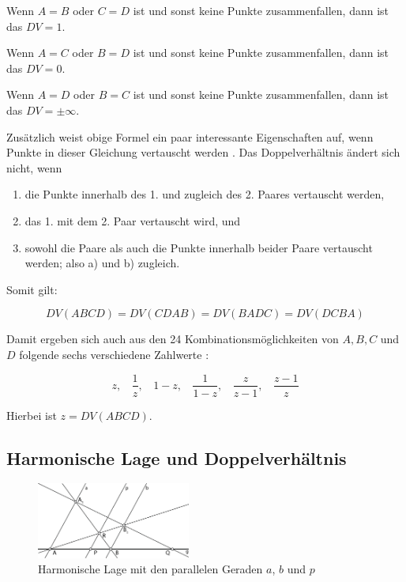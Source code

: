 \documentclass[12pt,a4paper]{article}
\begin{document}
Wenn $A = B$ oder $C = D$ ist und sonst keine Punkte zusammenfallen, dann ist das $DV = 1$.

Wenn $A = C$ oder $B = D$ ist und sonst keine Punkte zusammenfallen, dann ist das $DV = 0$.

Wenn $A = D$ oder $B = C$ ist und sonst keine Punkte zusammenfallen, dann ist das $DV = \pm\infty$.

Zusätzlich weist obige Formel ein paar interessante Eigenschaften auf, wenn Punkte in dieser Gleichung vertauscht werden \citep[vgl.][S.~77]{projektiveGeometrie}. Das Doppelverhältnis ändert sich nicht, wenn

\begin{enumerate}[label={\alph*)}] 
\item die Punkte innerhalb des 1. und zugleich des 2. Paares vertauscht werden,
\item das 1. mit dem 2. Paar vertauscht wird, und
\item sowohl die Paare als auch die Punkte innerhalb beider Paare vertauscht werden; also a) und b) zugleich.
\end{enumerate}

Somit gilt:

\[DV(A B C D) = DV(C D A B) = DV(B A D C) = DV(D C B A)\]

Damit ergeben sich auch aus den 24 Kombinationsmöglichkeiten von $A, B, C$ und $D$ folgende sechs verschiedene Zahlwerte \citep[s.][S.~77f]{projektiveGeometrie}:

\[z, ~~~~\dfrac{1}{z}, ~~~~1-z, ~~~~\dfrac{1}{1-z}, ~~~~\dfrac{z}{z-1}, ~~~~\dfrac{z-1}{z}\]

Hierbei ist $z = DV(A B C D)$.

\subsection{Harmonische Lage und Doppelverhältnis}

\begin{figure}
\hspace{-0.025\textwidth}
\includegraphics[width=0.45\textwidth]{Bilder/doppelverhaeltnis.png}
\caption{Harmonische Lage mit den parallelen Geraden $a$, $b$ und $p$}
\label{fig:harmonDoppel}
\end{figure}
\end{document}
